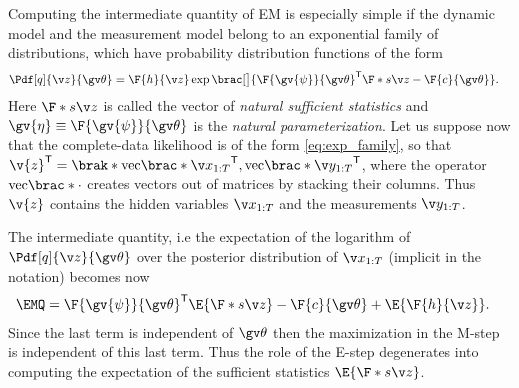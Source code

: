Computing the intermediate quantity of EM is especially simple
if the dynamic model and the measurement model belong to an exponential
family of distributions, which have probability distribution functions of the form 
\begin{align}
	\Pdf[q]{\z}{\Th}&=\F{h}{\z}\exp\brac[\big]{ \F{\gv{\psi}}{\Th}^\tr \F*{s}{\z}-\F{c}{\Th}}.
	\label{eq:exp_family}
\end{align}
Here $\F*{s}{\z}$ is called the vector of \emph{natural sufficient statistics} and
$\gv{\eta}\equiv \F{\gv{\psi}}{\Th}$ is the \emph{natural parameterization}.
Let us suppose now that the complete-data likelihood is of the form \eqref{eq:exp_family}, so
that $\v{z}^\tr=\brak*{\mathrm{vec}\brac*{\X}^\tr,\mathrm{vec}\brac*{\Y}^\tr}$, where the operator $\mathrm{vec}\brac*{\cdot}$
creates vectors out of matrices by stacking their columns. Thus $\v{z}$ 
contains the hidden variables $\X$ and the measurements $\Y$. 

The intermediate quantity, i.e the expectation of the logarithm of $\Pdf[q]{\z}{\Th}$ over the posterior distribution of 
$\X$ (implicit in the notation) becomes now
\begin{align}
	\EMQ&=	\F{\gv{\psi}}{\Th}^\tr \E{\F*{s}{\z}}-\F{c}{\Th}+\E{\F{h}{\z}}.
\end{align}
Since the last term is independent of $\Th$ then the maximization in the M-step
is independent of this last term. Thus the role of the E-step degenerates into computing the
expectation of the sufficient statistics $\E{\F*{s}{\z}}$.


